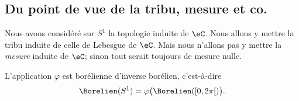 \subsection{Du point de vue de la tribu, mesure et co.}

Nous avons considéré sur \( S^1\) la topologie induite de \( \eC\). Nous allons y mettre la tribu induite de celle de Lebesgue de \( \eC\). Mais nous n'allons pas y mettre la \emph{mesure} induite de \( \eC\); sinon tout serait toujours de mesure nulle.

\begin{proposition}      \label{PROPooQFYHooEajmbW}
	L'application \( \varphi\) est borélienne d'inverse borélien, c'est-à-dire
	\begin{equation}
		\Borelien(S^1)=\varphi\big( \Borelien(\mathopen[ 0 , 2\pi \mathclose[) \big).
	\end{equation}
\end{proposition}

